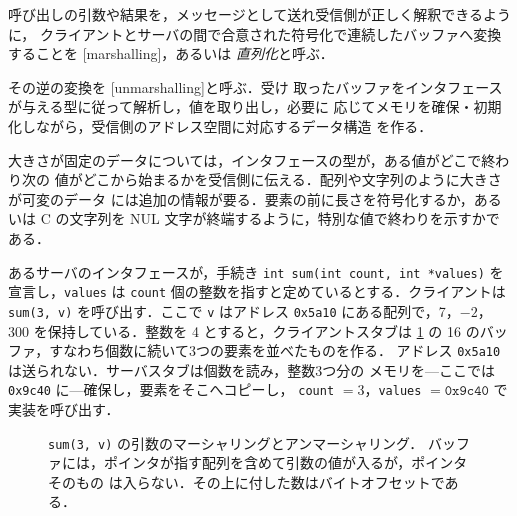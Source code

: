 \documentclass[../main.tex]{subfiles}
\begin{document}
\begin{definition}[マーシャリング]
  呼び出しの引数や結果を，メッセージとして送れ受信側が正しく解釈できるように，
  クライアントとサーバの間で合意された符号化で連続したバッファへ変換することを
  [marshalling]，あるいは
  \emph{直列化}と呼ぶ．
\end{definition}

\begin{definition}[アンマーシャリング]
  その逆の変換を
  [unmarshalling]と呼ぶ．受け
  取ったバッファをインタフェースが与える型に従って解析し，値を取り出し，必要に
  応じてメモリを確保・初期化しながら，受信側のアドレス空間に対応するデータ構造
  を作る．
\end{definition}

大きさが固定のデータについては，インタフェースの型が，ある値がどこで終わり次の
値がどこから始まるかを受信側に伝える．配列や文字列のように大きさが可変のデータ
には追加の情報が要る．要素の前に長さを符号化するか，あるいは C の文字列を NUL
文字が終端するように，特別な値で終わりを示すかである．

\begin{example}
  \label{ex:l13-marshal}
  あるサーバのインタフェースが，手続き
  \texttt{int sum(int count, int *values)} を宣言し，\texttt{values} は
  \texttt{count} 個の整数を指すと定めているとする．クライアントは
  \texttt{sum(3, v)} を呼び出す．ここで \texttt{v} はアドレス
  \texttt{0x5a10} にある配列で，7，$-2$，300 を保持している．整数を
  \SI{4}{\byte} とすると，クライアントスタブは \cref{fig:l13-marshal} の
  \SI{16}{\byte} のバッファ，すなわち個数に続いて3つの要素を並べたものを作る．
  アドレス \texttt{0x5a10} は送られない．サーバスタブは個数を読み，整数3つ分の
  メモリを---ここでは \texttt{0x9c40} に---確保し，要素をそこへコピーし，
  \texttt{count} $=3$，\texttt{values} $=\mathtt{0x9c40}$ で実装を呼び出す．%
\end{example}

\begin{figure}[htbp]
  \centering
  
  \caption{\texttt{sum(3, v)} の引数のマーシャリングとアンマーシャリング．
    バッファには，ポインタが指す配列を含めて引数の値が入るが，ポインタそのもの
    は入らない．その上に付した数はバイトオフセットである．}
  \label{fig:l13-marshal}
\end{figure}
\end{document}
